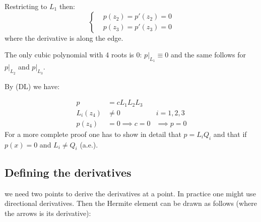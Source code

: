 Restricting to $L_1$ then:
\[
\begin{cases}
& p(z_2)= p'(z_2) = 0 \\
& p(z_3) = p'(z_3) = 0
\end{cases}
\]
where the derivative is along the edge.
\begin{center}
\end{center}

The only cubic polynomial with 4 roots is $0$: $p\lvert_{L_1} \equiv 0$ and the same follows for $p\lvert_{L_2}$ and $p\lvert_{L_3}$.

By (DL) we have:

\[
\begin{aligned}
    p &= c L_1 L_2 L_3 &\\
    L_i(z_4) &\neq 0 & i = 1,2,3 \\
    p(z_4) &= 0 \implies c = 0 &\implies \boxed{p = 0}
\end{aligned}
\]
For a more complete proof one has to show in detail that $p = L_i Q_i$ and that if $p(x) = 0$ and $L_i \neq Q_i$ (a.e.).

\subsection{Defining the derivatives}
we need two points to derive the derivatives at a point.
In practice one might use directional derivatives.
Then the Hermite element can be drawn as follows (where the arrows is its derivative):

